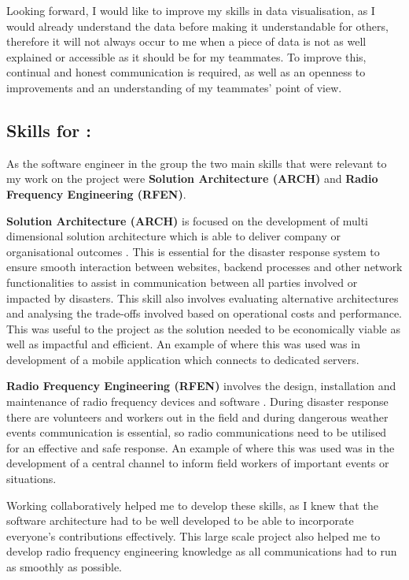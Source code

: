 \documentclass[a4paper, 11pt]{report}
\begin{document}
Looking forward, I would like to improve my skills in data visualisation, as I would already understand the data before making it understandable for others, therefore it will not always occur to me when a piece of data is not as well explained or accessible as it should be for my teammates. To improve this, continual and honest communication is required, as well as an openness to improvements and an understanding of my teammates’ point of view.\newline

\newpage

\subsection{Skills for \majC: \studC}

As the software engineer in the group the two main skills that were relevant to my work on the project were \textbf{Solution Architecture (ARCH)} and \textbf{Radio Frequency Engineering (RFEN)}.\newline


\textbf{Solution Architecture (ARCH)} is focused on the development of multi dimensional solution architecture which is able to deliver company or organisational outcomes \cite{sfiaARCH}. This is essential for the disaster response system to ensure smooth interaction between websites, backend processes and other network functionalities to assist in communication between all parties involved or impacted by disasters. This skill also involves evaluating alternative architectures and analysing the trade-offs involved based on operational costs and performance. This was useful to the project as the solution needed to be economically viable as well as impactful and efficient. An example of where this was used was in development of a mobile application which connects to dedicated servers.\newline


\textbf{Radio Frequency Engineering (RFEN)} involves the design, installation and maintenance of radio frequency devices and software \cite{sfiaRFEN}. During disaster response there are volunteers and workers out in the field and during dangerous weather events communication is essential, so radio communications need to be utilised for an effective and safe response. An example of where this was used was in the development of a central channel to inform field workers of important events or situations.\newline

Working collaboratively helped me to develop these skills, as I knew that the software architecture had to be well developed to be able to incorporate everyone's contributions effectively. This large scale project also helped me to develop radio frequency engineering knowledge as all communications had to run as smoothly as possible.\newline
\end{document}
